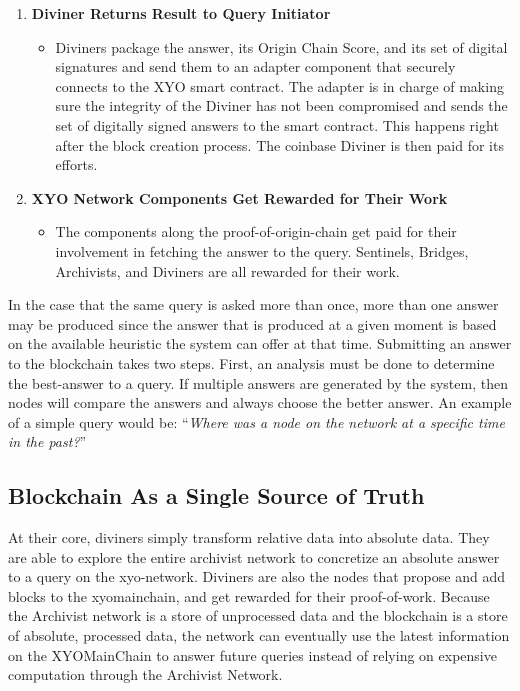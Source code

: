 \documentclass{article}
\begin{document}
\begin{enumerate}
\begin{itemize}
  \end{itemize}
  \item \textbf{Diviner Returns Result to Query Initiator}
  \begin{itemize}
    \item Diviners package the answer, its Origin Chain Score, and its set of digital signatures and send them to an adapter component that securely connects to the XYO smart contract. The adapter is in charge of making sure the integrity of the Diviner has not been compromised and sends the set of digitally signed answers to the smart contract. This happens right after the block creation process. The coinbase Diviner is then paid for its efforts.
  \end{itemize}
  \item \textbf{XYO Network Components Get Rewarded for Their Work}
  \begin{itemize}
    \item The components along the \Gls{proof-of-origin-chain} get paid for their involvement in fetching the answer to the query. Sentinels, Bridges, Archivists, and Diviners are all rewarded for their work.

  \end{itemize}
\end{enumerate}

In the case that the same query is asked more than once, more than one answer may be produced since the answer that is produced at a given moment is based on the available heuristic the system can offer at that time. Submitting an answer to the blockchain takes two steps. First, an analysis must be done to determine the \Gls{best-answer} to a query. If multiple answers are generated by the system, then nodes will compare the answers and always choose the better answer. An example of a simple query would be: ``\textit{Where was a node on the network at a specific time in the past?}''

\subsection{Blockchain As a Single Source of Truth}

At their core, \Glspl{diviner} simply transform relative data into absolute data. They are able to explore the entire \Gls{archivist} network to concretize an absolute answer to a query on the \Gls{xyo-network}. Diviners are also the nodes that propose and add blocks to the \Gls{xyomainchain}, and get rewarded for their \Gls{proof-of-work}. Because the Archivist network is a store of unprocessed data and the blockchain is a store of absolute, processed data, the network can eventually use the latest information on the XYOMainChain to answer future queries instead of relying on expensive computation through the Archivist Network.
\end{document}
